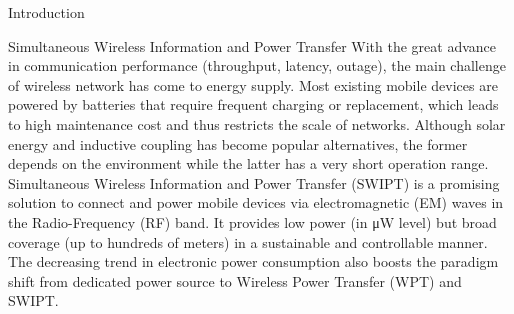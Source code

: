 \documentclass[journal]{IEEEtran}
\begin{document}
\begin{section}{Introduction}
	\begin{subsection}{Simultaneous Wireless Information and Power Transfer}
		With the great advance in communication performance (throughput, latency, outage), the main challenge of wireless network has come to energy supply. Most existing mobile devices are powered by batteries that require frequent charging or replacement, which leads to high maintenance cost and thus restricts the scale of networks. Although solar energy and inductive coupling has become popular alternatives, the former depends on the environment while the latter has a very short operation range. Simultaneous Wireless Information and Power Transfer (SWIPT) is a promising solution to connect and power mobile devices via electromagnetic (EM) waves in the Radio-Frequency (RF) band. It provides low power (in \si{\uW} level) but broad coverage (up to hundreds of meters) \cite{Ng2018} in a sustainable and controllable manner. The decreasing trend in electronic power consumption also boosts the paradigm shift from dedicated power source to Wireless Power Transfer (WPT) and SWIPT.


\end{subsection}
\end{section}
\end{document}
